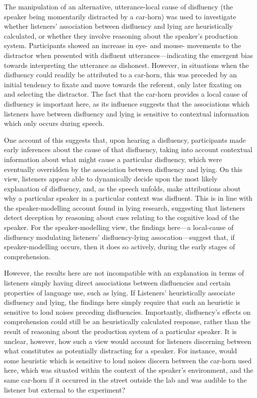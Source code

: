 \documentclass[a4paper,man,natbib]{apa6}
\begin{document}
The manipulation of an alternative, utterance-local cause of disfluency (the speaker being momentarily distracted by a car-horn) was used to investigate whether listeners' association between disfluency and lying are heuristically calculated, or whether they involve reasoning about the speaker's production system. 
Participants showed an increase in eye- and mouse- movements to the distractor when presented with disfluent utterances---indicating the emergent bias towards interpreting the utterance as dishonest. 
However, in situations when the disfluency could readily be attributed to a car-horn, this was preceded by an initial tendency to fixate and move towards the referent, only later fixating on and selecting the distractor. 
The fact that the car-horn provides a local cause of disfluency is important here, as its influence suggests that the associations which listeners have between disfluency and lying is sensitive to contextual information which only occurs during speech. 

One account of this suggests that, upon hearing a disfluency, participants made early inferences about the cause of that disfluency, taking into account contextual information about what might cause a particular disfluency, which were eventually overridden by the association between disfluency and lying.
On this view, listeners appear able to dynamically decide upon the most likely explanation of disfluency, and, as the speech unfolds, make attributions about why a particular speaker in a particular context was disfluent. 
This is in line with the speaker-modelling account found in lying research, suggesting that listeners detect deception by reasoning about cues relating to the cognitive load of the speaker\citep{Zuckerman1981,depaulo2003cues}.
For the speaker-modelling view, the findings here---a local-cause of disfluency modulating listeners' disfluency-lying assocation---suggest that, if speaker-modelling occurs, then it does so actively, during the early stages of comprehension. 

However, the results here are not incompatible with an explanation in terms of listeners simply having direct associations between disfluencies and certain properties of language use, such as lying. 
If Listeners' heuristically associate disfluency and lying, the findings here simply require that such an heuristic is sensitive to loud noises preceding disfluencies. 
Importantly, disfluency's effects on comprehension could still be an heuristically calculated response, rather than the result of reasoning about the production system of a particular speaker.
It is unclear, however, how such a view would account for listeners discerning between what constitutes as potentially distracting for a speaker. 
For instance, would some heuristic which is sensitive to loud noises discern between the car-horn used here, which was situated within the context of the speaker's environment, and the same car-horn if it occurred in the street outside the lab and was audible to the listener but external to the experiment?
\end{document}
